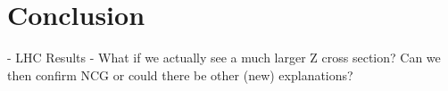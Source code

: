\section{Conclusion}
- LHC Results
- What if we actually see a much larger Z cross section? Can we then confirm NCG or could there be other (new) explanations?